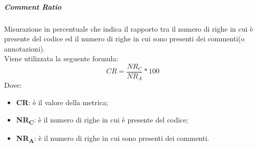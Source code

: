 \subparagraph{Comment Ratio}\Spazio
Misurazione in percentuale che indica il rapporto tra il numero di righe in cui è presente del codice ed il numero di righe in cui sono presenti dei commenti(o annotazioni). \\
Viene utilizzata la seguente formula:
$$CR=\frac{NR_C}{NR_A}*100$$
Dove:
\begin{itemize}
	\item{\textbf{CR}: è il valore della metrica;}
	\item{\textbf{NR\textsubscript{C}}: è il numero di righe in cui è presente del codice;}
	\item{\textbf{NR\textsubscript{A}}: è il numero di righe in cui sono presenti dei commenti.}
\end{itemize}

\pagebreak
